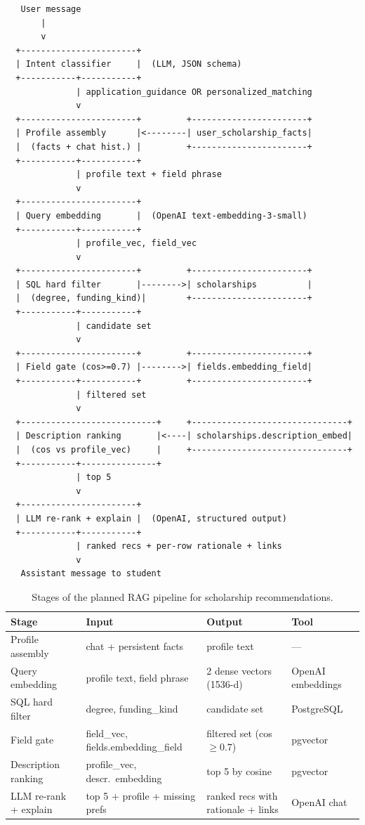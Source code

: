 \begin{verbatim}
   User message
       |
       v
  +-----------------------+
  | Intent classifier     |  (LLM, JSON schema)
  +-----------+-----------+
              | application_guidance OR personalized_matching
              v
  +-----------------------+         +-----------------------+
  | Profile assembly      |<--------| user_scholarship_facts|
  |  (facts + chat hist.) |         +-----------------------+
  +-----------+-----------+
              | profile text + field phrase
              v
  +-----------------------+
  | Query embedding       |  (OpenAI text-embedding-3-small)
  +-----------+-----------+
              | profile_vec, field_vec
              v
  +-----------------------+         +-----------------------+
  | SQL hard filter       |-------->| scholarships          |
  |  (degree, funding_kind)|        +-----------------------+
  +-----------+-----------+
              | candidate set
              v
  +-----------------------+         +-----------------------+
  | Field gate (cos>=0.7) |-------->| fields.embedding_field|
  +-----------+-----------+         +-----------------------+
              | filtered set
              v
  +---------------------------+     +-------------------------------+
  | Description ranking       |<----| scholarships.description_embed|
  |  (cos vs profile_vec)     |     +-------------------------------+
  +-----------+---------------+
              | top 5
              v
  +-----------------------+
  | LLM re-rank + explain |  (OpenAI, structured output)
  +-----------+-----------+
              | ranked recs + per-row rationale + links
              v
   Assistant message to student
\end{verbatim}

\begin{table}[H]
\centering
\small
\begin{tabular}{|l|l|l|l|}
\hline
\textbf{Stage} & \textbf{Input} & \textbf{Output} & \textbf{Tool} \\
\hline
Profile assembly        & chat + persistent facts            & profile text                       & --- \\
Query embedding         & profile text, field phrase         & 2 dense vectors (1536-d)           & OpenAI embeddings \\
SQL hard filter         & degree, funding\_kind              & candidate set                      & PostgreSQL \\
Field gate              & field\_vec, fields.embedding\_field & filtered set (cos $\geq 0.7$)     & pgvector \\
Description ranking     & profile\_vec, descr.\ embedding    & top 5 by cosine                    & pgvector \\
LLM re-rank + explain   & top 5 + profile + missing prefs    & ranked recs with rationale + links & OpenAI chat \\
\hline
\end{tabular}
\caption{Stages of the planned RAG pipeline for scholarship recommendations.}
\end{table}


